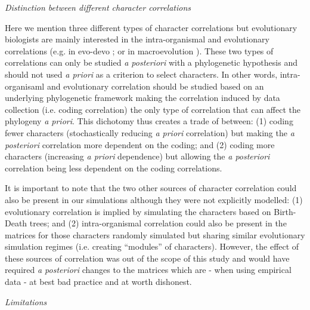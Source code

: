 \documentclass[12pt,letterpaper]{article}
\renewcommand{\subsection}[1]{%
\bigskip
\begin{center}
\begin{large}
\normalfont\itshape #1
\end{large}
\end{center}}
\begin{document}
\subsection{Distinction between different character correlations}
Here we mention three different types of character correlations but evolutionary biologists are mainly interested in the intra-organismal and evolutionary correlations (e.g. in evo-devo \citealt{goswami2006morphological}; or in macroevolution \citealt{fitzjohn2014much}).
These two types of correlations can only be studied \textit{a posteriori} with a phylogenetic hypothesis and should not used \textit{a priori} as a criterion to select characters.
In other words, intra-organisaml and evolutionary correlation should be studied based on an underlying phylogenetic framework making the correlation induced by data collection (i.e. coding correlation) the only type of correlation that can affect the phylogeny \textit{a priori}.
This dichotomy thus creates a trade of between: (1) coding fewer characters (stochastically reducing \textit{a priori} correlation) but making the \textit{a posteriori} correlation more dependent on the coding;
and (2) coding more characters (increasing \textit{a priori} dependence) but allowing the \textit{a posteriori} correlation being less dependent on the coding correlations.

It is important to note that the two other sources of character correlation could also be present in our simulations although they were not explicitly modelled:
(1) evolutionary correlation is implied by simulating the characters based on Birth-Death trees;
and (2) intra-organismal correlation could also be present in the matrices for those characters randomly simulated but sharing similar evolutionary simulation regimes (i.e. creating ``modules'' of characters).
However, the effect of these sources of correlation was out of the scope of this study and would have required \textit{a posteriori} changes to the matrices which are - when using empirical data - at best bad practice and at worth dishonest.

\subsection{Limitations}
\end{document}
